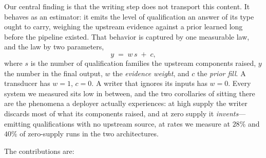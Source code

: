 \documentclass[11pt]{article}
\newcommand{\ww}{\ensuremath{w}}
\newcommand{\cc}{\ensuremath{c}}
\begin{document}
Our central finding is that the writing step does not transport this content.
It behaves as an estimator: it emits the level of qualification an answer of
its type ought to carry, weighing the upstream evidence against a prior
learned long before the pipeline existed. That behavior is captured by one
measurable law, and the law by two parameters,
\begin{equation}
\label{eq:law}
y \;=\; \ww\, s \;+\; \cc ,
\end{equation}
where $s$ is the number of qualification families the upstream components
raised, $y$ the number in the final output, $\ww$ the \emph{evidence weight},
and $\cc$ the \emph{prior fill}. A transducer has $\ww=1$, $\cc=0$. A writer
that ignores its inputs has $\ww=0$. Every system we measured sits low in
between, and the two corollaries of sitting there are the phenomena a
deployer actually experiences: at high supply the writer discards most of
what its components raised, and at zero supply it \emph{invents}---emitting
qualifications with no upstream source, at rates we measure at $28\%$
and $40\%$ of zero-supply runs in the two architectures.

The contributions are:
\end{document}
